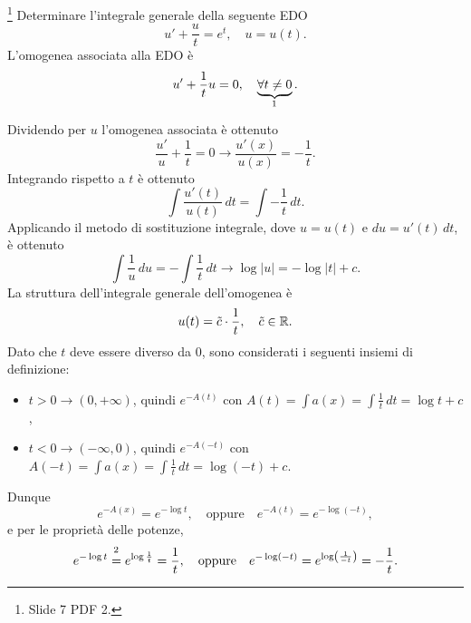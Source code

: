 \begin{example}\footnote{Slide 7 PDF 2.}
    Determinare l'integrale generale della seguente EDO
    \begin{equation*}
        u'+\frac{u}{t}=e^t,\quad u=u(t).
    \end{equation*}
    L'omogenea associata alla EDO è
    \begin{equation*}
        u'+\frac{1}{t}u=0,\quad \underbrace{\forall t\neq 0}_{\footnotemark}.
    \end{equation*}
    Dividendo per $u$ l'omogenea associata è ottenuto
    \begin{equation*}
       \frac{u'}{u}+\frac{1}{t}=0\rightarrow\frac{u'(x)}{u(x)}=-\frac{1}{t}.
    \end{equation*}
    Integrando rispetto a $t$ è ottenuto
    \begin{equation*}
        \int \frac{u'(t)}{u(t)}\, dt=\int-\frac{1}{t}\, dt.
    \end{equation*}
    Applicando il metodo di sostituzione integrale, dove $u=u(t)$ e $ du=u'(t)\, dt$, è ottenuto
    \begin{equation*}
        \int\frac{1}{u}\, du= -\int\frac{1}{t}\, dt\rightarrow\log|u|=-\log|t|+c.
    \end{equation*}
    La struttura dell'integrale generale dell'omogenea è
    \begin{equation*}
        u(t)=\Tilde{c}\cdot\frac{1}{t},\quad \Tilde{c}\in\mathbb R.
    \end{equation*}
    Dato che $t$ deve essere diverso da 0, sono considerati i seguenti insiemi di definizione:
    \begin{itemize}
        \item $t>0 \rightarrow (0,+\infty)$, quindi $e^{-A(t)}$ con $A(t)=\int a(x)=\int\frac{1}{t}\, dt=\log t+c$,
        \item $t<0 \rightarrow (-\infty, 0)$, quindi $e^{-A(-t)}$ con $A(-t)=\int a(x)=\int\frac{1}{t}\, dt=\log(-t)+c$.
    \end{itemize}
    Dunque
    \begin{equation*}
        e^{-A(x)}=e^{-\log t},\quad\text{oppure}\quad e^{-A(t)}=e^{-\log(-t)},
    \end{equation*}
    e per le proprietà delle potenze,
    \begin{equation*}
        e^{-\log t}\overset{\footnotemark}{=}e^{\log\frac{1}{t}}=\frac{1}{t},\quad\text{oppure}\quad e^{-\log(-t)}=e^{\log\left(\frac{1}{-t}\right)}=-\frac{1}{t}.

\end{equation*}
\end{example}
